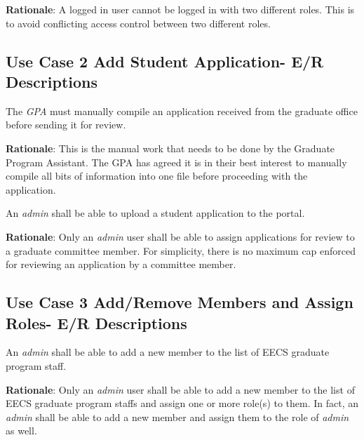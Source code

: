 \documentclass[fontsize=12pt,paper=letter,twoside]{scrartcl}
\begin{document}
\smallskip
\noindent \textbf{Rationale}: A logged in user cannot be logged in with two different roles. This is to avoid conflicting access control between two different roles.

\subsection{Use Case 2 Add Student Application- E/R Descriptions}

\genenv
{The \emph{GPA} must manually compile an application received from the graduate office before sending it for review. \\}
{}
\label{E3}

\smallskip
\noindent \textbf{Rationale}: This is the manual work that needs to be done by the Graduate Program Assistant. The GPA has agreed it is in their best interest to manually compile all bits of information into one file before proceeding with the application.

\genreq
{An \emph{admin} shall be able to upload a student application to the portal.\\}
{}
\label{R7}

\smallskip
\noindent \textbf{Rationale}: Only an \emph{admin} user shall be able to assign applications for review to a graduate committee member. For simplicity, there is no maximum cap enforced for reviewing an application by a committee member.



\subsection{Use Case 3 Add/Remove Members and Assign Roles- E/R Descriptions}

\genreq
{An \emph{admin} shall be able to add a new member to the list of EECS graduate program staff.\\}
{}
\label{R8}

\smallskip
\noindent \textbf{Rationale}: Only an \emph{admin} user shall be able to add a new member to the list of EECS graduate program staffs and assign one or more role(s) to them. In fact, an \emph{admin} shall be able to add a new member and assign them to the role of \emph{admin} as well.
\end{document}

